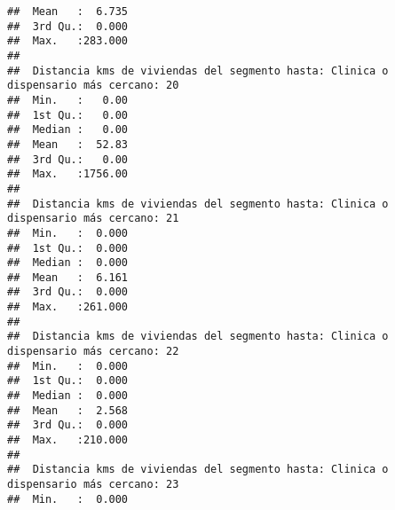 \documentclass[11pt,]{article}
\begin{document}
\begin{verbatim}
##  Mean   :  6.735                                                                     
##  3rd Qu.:  0.000                                                                     
##  Max.   :283.000                                                                     
##                                                                                      
##  Distancia kms de viviendas del segmento hasta: Clinica o dispensario más cercano: 20
##  Min.   :   0.00                                                                     
##  1st Qu.:   0.00                                                                     
##  Median :   0.00                                                                     
##  Mean   :  52.83                                                                     
##  3rd Qu.:   0.00                                                                     
##  Max.   :1756.00                                                                     
##                                                                                      
##  Distancia kms de viviendas del segmento hasta: Clinica o dispensario más cercano: 21
##  Min.   :  0.000                                                                     
##  1st Qu.:  0.000                                                                     
##  Median :  0.000                                                                     
##  Mean   :  6.161                                                                     
##  3rd Qu.:  0.000                                                                     
##  Max.   :261.000                                                                     
##                                                                                      
##  Distancia kms de viviendas del segmento hasta: Clinica o dispensario más cercano: 22
##  Min.   :  0.000                                                                     
##  1st Qu.:  0.000                                                                     
##  Median :  0.000                                                                     
##  Mean   :  2.568                                                                     
##  3rd Qu.:  0.000                                                                     
##  Max.   :210.000                                                                     
##                                                                                      
##  Distancia kms de viviendas del segmento hasta: Clinica o dispensario más cercano: 23
##  Min.   :  0.000                                                                     

\end{verbatim}
\end{document}

